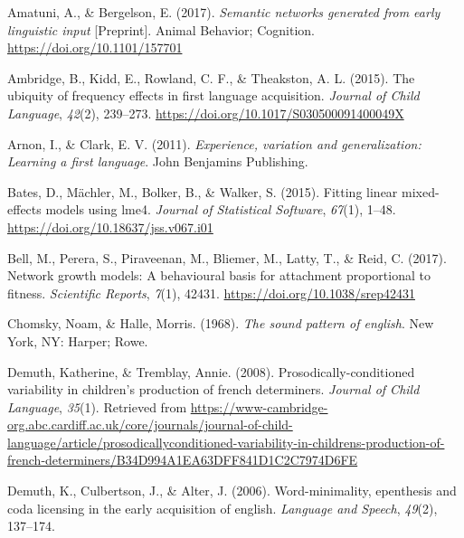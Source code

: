 \documentclass[
  man,mask,floatsintext]{apa6}
\newlength{\cslhangindent}
\newlength{\cslentryspacingunit} %
\newenvironment{CSLReferences}[2] %
 {%
  \setlength{\parindent}{0pt}
  \ifodd #1
  \let\oldpar\par
  \def\par{\hangindent=\cslhangindent\oldpar}
  \fi
  \setlength{\parskip}{#2\cslentryspacingunit}
 }%
 {}
\begin{document}
\hypertarget{refs}{}
\begin{CSLReferences}{1}{0}
\leavevmode{}%
Amatuni, A., \& Bergelson, E. (2017). \emph{Semantic networks generated from early linguistic input} {[}Preprint{]}. Animal Behavior; Cognition. \url{https://doi.org/10.1101/157701}

\leavevmode{}%
Ambridge, B., Kidd, E., Rowland, C. F., \& Theakston, A. L. (2015). The ubiquity of frequency effects in first language acquisition. \emph{Journal of Child Language}, \emph{42}(2), 239--273. \url{https://doi.org/10.1017/S030500091400049X}

\leavevmode{}%
Arnon, I., \& Clark, E. V. (2011). \emph{Experience, variation and generalization: Learning a first language}. John Benjamins Publishing.

\leavevmode{}%
Bates, D., Mächler, M., Bolker, B., \& Walker, S. (2015). Fitting linear mixed-effects models using {lme4}. \emph{Journal of Statistical Software}, \emph{67}(1), 1--48. \url{https://doi.org/10.18637/jss.v067.i01}

\leavevmode{}%
Bell, M., Perera, S., Piraveenan, M., Bliemer, M., Latty, T., \& Reid, C. (2017). Network growth models: A behavioural basis for attachment proportional to fitness. \emph{Scientific Reports}, \emph{7}(1), 42431. \url{https://doi.org/10.1038/srep42431}

\leavevmode{}%
Chomsky, Noam, \& Halle, Morris. (1968). \emph{The sound pattern of english}. New York, {NY}: Harper; Rowe.

\leavevmode{}%
Demuth, Katherine, \& Tremblay, Annie. (2008). Prosodically-conditioned variability in children's production of french determiners. \emph{Journal of Child Language}, \emph{35}(1). Retrieved from \url{https://www-cambridge-org.abc.cardiff.ac.uk/core/journals/journal-of-child-language/article/prosodicallyconditioned-variability-in-childrens-production-of-french-determiners/B34D994A1EA63DFF841D1C2C7974D6FE}

\leavevmode{}%
Demuth, K., Culbertson, J., \& Alter, J. (2006). Word-minimality, epenthesis and coda licensing in the early acquisition of english. \emph{Language and Speech}, \emph{49}(2), 137--174.


\end{CSLReferences}
\end{document}
